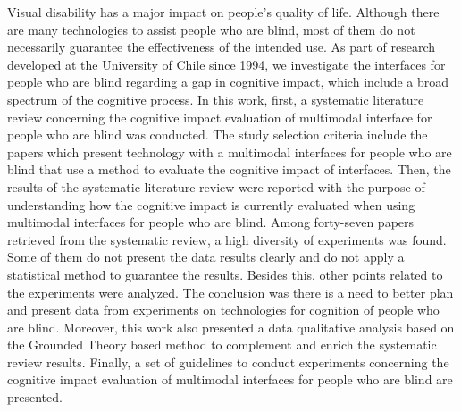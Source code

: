 Visual disability has a major impact on people’s quality of life. Although there are many technologies to assist people who are blind, most of them do not necessarily guarantee the effectiveness of the intended use. As part of research developed at the University of Chile since 1994, we investigate the interfaces for people who are blind regarding a gap in cognitive impact, which include a broad spectrum of the cognitive process. In this work, first, a systematic literature review concerning the cognitive impact evaluation of multimodal interface for people who are blind was conducted. The study selection criteria include the papers which present technology with a multimodal interfaces for people who are blind that use a method to evaluate the cognitive impact of interfaces. Then, the results of the systematic literature review were reported with the purpose of understanding how the cognitive impact is currently evaluated when using multimodal interfaces for people who are blind. Among forty-seven papers retrieved from the systematic review, a high diversity of experiments was found. Some of them do not present the data results clearly and do not apply a statistical method to guarantee the results. Besides this, other points related to the experiments were analyzed. The conclusion was there is a need to better plan and present data from experiments on technologies for cognition of people who are blind. Moreover, this work also presented a data qualitative analysis based on the Grounded Theory based method to complement and enrich the systematic review results. Finally, a set of guidelines to conduct experiments concerning the cognitive impact evaluation of multimodal interfaces for people who are blind are presented.


